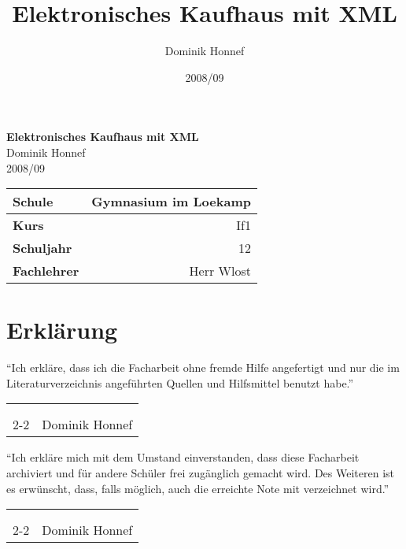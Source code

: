 \documentclass[12pt,oneside,ngerman,a4paper,bibgerm]{scrreprt}
\author{Dominik Honnef}
\title{Elektronisches Kaufhaus mit XML}
\date{2008/09}
\makeatletter
\newcommand{\signature}[1]{
  \vspace*{\bigskipamount}
  \hfill
  \begin{tabularx}{0.95\linewidth}{Xr}
    \\
    \\
    \\
    \cline{2-2}
    & \makebox[4cm][r]#1
  \end{tabularx}
  \vspace*{\bigskipamount}
}
\renewcommand*{\lstlistoflistings}{%
  \begingroup
    \if@twocolumn
      \@restonecoltrue\onecolumn
    \else
      \@restonecolfalse
    \fi
    \lol@heading
    \setlength{\parskip}{\z@}%
    \setlength{\parindent}{\z@}%
    \setlength{\parfillskip}{\z@ \@plus 1fil}%
    \@starttoc{lol}%
    \if@restonecol\twocolumn\fi
  \endgroup
}
\renewcommand*{\chapterpagestyle}{scrheadings}
\makeatother
\begin{document}
\onehalfspacing
\clearpage
\begingroup
{}
\renewcommand*{\chapterpagestyle}{empty}
\pagestyle{empty}
\vspace*{\fill}
\begin{center}
  \textbf{\huge{Elektronisches Kaufhaus mit XML}} \\
  \bigskip
  \small{Dominik Honnef} \\
  \bigskip
  \small{2008/09}
\end{center}
\vspace*{\fill}
\begin{tabular}{|l|r|}
  \hline
  \textbf{Schule} & Gymnasium im Loekamp \\
  \hline
  \textbf{Kurs} & If1 \\
  \hline
  \textbf{Schuljahr} & 12 \\
  \hline
  \textbf{Fachlehrer} & Herr Wlost \\
  \hline
\end{tabular}
\clearpage
\tableofcontents{}
\clearpage
\endgroup
\newpage







\chapter*{Erklärung}
"`Ich erkläre, dass ich die Facharbeit ohne fremde
Hilfe angefertigt und nur die
im Literaturverzeichnis angeführten Quellen und Hilfsmittel benutzt habe."' \\
\signature{Dominik Honnef}

"`Ich erkläre mich mit dem Umstand einverstanden, dass diese
Facharbeit archiviert und für andere Schüler frei zugänglich gemacht
wird. Des Weiteren ist es erwünscht, dass, falls möglich, auch die
erreichte Note mit verzeichnet wird."' \\
\signature{Dominik Honnef}
\end{document}
